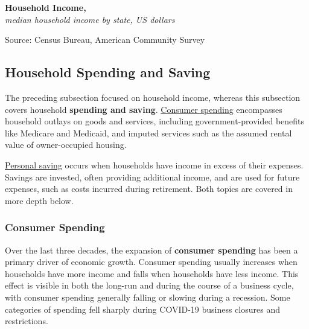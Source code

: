 \documentclass{report}
\newcommand{\tbllink}[1]{\href{https://raw.githubusercontent.com/bdecon/US-chartbook/master/chartbook/data/#1}{\faTable}}
\begin{document}
{\normalsize \textbf{Household Income, }\\
\footnotesize{\textit{median household income by state, US dollars}}
\vspace{-3mm}

\hspace{-5mm} 
\vspace{-6mm}

\begin{minipage}{0.76\textwidth} 
\footnotesize{Source: Census Bureau, American Community Survey} \hfill \tbllink{median_hh_inc_state.csv}
\end{minipage}
\newpage 
\begin{minipage}{0.76\textwidth}    
\subsection*{Household Spending and Saving}
\hypertarget{hhss}{\label{hhss}} 
\small The preceding subsection focused on household income, whereas this subsection covers household \textbf{spending and saving}. \href{https://www.bea.gov/data/consumer-spending/main}{Consumer spending} encompasses household outlays on goods and services, including government-provided benefits like Medicare and Medicaid, and imputed services such as the assumed rental value of owner-occupied housing.

\href{https://www.bea.gov/data/income-saving/personal-saving-rate}{Personal saving} occurs when households have income in excess of their expenses. Savings are invested, often providing additional income, and are used for future expenses, such as costs incurred during retirement. Both topics are covered in more depth below.
\vspace{1mm}

\subsubsection*{Consumer Spending}
\vspace{-1mm}

\small Over the last three decades, the expansion of \textbf{consumer spending} has been a primary driver of economic growth. Consumer spending usually increases when households have more income and falls when households have less income. This effect is visible in both the long-run and during the course of a business cycle, with consumer spending generally falling or slowing during a recession. Some categories of spending fell sharply during COVID-19 business closures and restrictions.


\end{minipage}}
\end{document}
